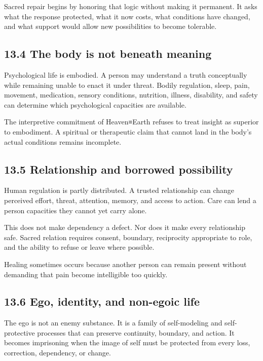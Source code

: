 \documentclass[
  11pt,
]{article}
\begin{document}
Sacred repair begins by honoring that logic without making it permanent.
It asks what the response protected, what it now costs, what conditions
have changed, and what support would allow new possibilities to become
tolerable.

\subsection{13.4 The body is not beneath
meaning}\label{the-body-is-not-beneath-meaning}

Psychological life is embodied. A person may understand a truth
conceptually while remaining unable to enact it under threat. Bodily
regulation, sleep, pain, movement, medication, sensory conditions,
nutrition, illness, disability, and safety can determine which
psychological capacities are available.

The interpretive commitment of Heaven≡Earth refuses to treat insight as
superior to embodiment. A spiritual or therapeutic claim that cannot
land in the body's actual conditions remains incomplete.

\subsection{13.5 Relationship and borrowed
possibility}\label{relationship-and-borrowed-possibility}

Human regulation is partly distributed. A trusted relationship can
change perceived effort, threat, attention, memory, and access to
action. Care can lend a person capacities they cannot yet carry alone.

This does not make dependency a defect. Nor does it make every
relationship safe. Sacred relation requires consent, boundary,
reciprocity appropriate to role, and the ability to refuse or leave
where possible.

Healing sometimes occurs because another person can remain present
without demanding that pain become intelligible too quickly.

\subsection{13.6 Ego, identity, and non-egoic
life}\label{ego-identity-and-non-egoic-life}

The ego is not an enemy substance. It is a family of self-modeling and
self-protective processes that can preserve continuity, boundary, and
action. It becomes imprisoning when the image of self must be protected
from every loss, correction, dependency, or change.
\end{document}
